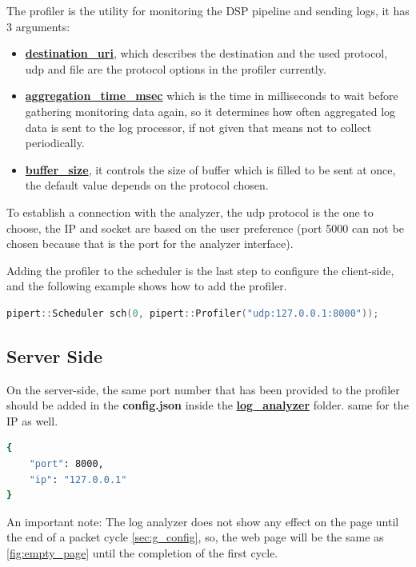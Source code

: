 The profiler is the utility for monitoring the DSP pipeline and sending logs,
it has 3 arguments:
\begin{itemize}
	\item \textbf{\url{destination_uri}}, which describes the destination and the used protocol, udp and file 
	are the protocol options in the profiler currently.
	\item \textbf{\url{aggregation_time_msec}} which is the time in milliseconds to wait 
	before gathering monitoring data again, so it determines how often aggregated
	log data is sent to the log processor, if not given that means not to collect
	periodically.
	\item \textbf{\url{buffer_size}}, it controls the size
	of buffer which is filled to be sent at once, the default value depends on the
	protocol chosen.
\end{itemize} 

To establish a connection with the analyzer, the udp protocol
is the one to choose, the IP and socket are based on the user
preference (port 5000 can not be chosen because that is the port
for the analyzer interface).

Adding the profiler to the scheduler is the last step to configure
the client-side, and the following example shows how to add the profiler.
\newline
\begin{lstlisting}[language=c++, caption={Adding the profiler},captionpos=b]
	pipert::Scheduler sch(0, pipert::Profiler("udp:127.0.0.1:8000"));
\end{lstlisting}

\subsection{Server Side}\label{client_side}
On the server-side, the same port number that has been provided to the profiler
should be added in the \textbf{config.json} inside the \textbf{\url{log_analyzer}} folder. same for
the IP as well.
\newline
\begin{lstlisting}[language=bash, caption={connection configuration},captionpos=b]
{
    "port": 8000,
    "ip": "127.0.0.1"
}
\end{lstlisting}

An important note: The log analyzer does not show any effect on the page until the end of a packet cycle
\ref{sec:g_config}, so, the web page will be the same as \ref{fig:empty_page} 
until the completion of the first cycle.

